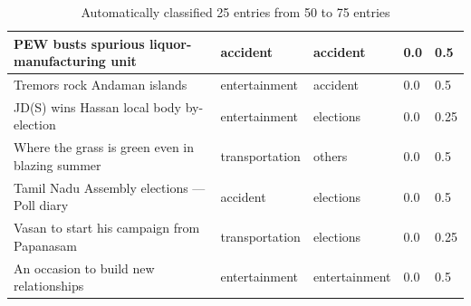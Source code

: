 \begin{table}
\begin{tabular}{ | p{5.4cm} | p{2.0cm} | p{2.0cm}|p{1.3cm}|p{1.5cm}|}
\hline
PEW busts spurious liquor-manufacturing unit & accident  & accident & 0.0 & 0.5 \\
\hline
Tremors rock Andaman islands & entertainment  & accident & 0.0 & 0.5 \\
\hline
JD(S) wins Hassan local body by-election & entertainment  & elections & 0.0 & 0.25 \\
\hline
Where the grass is green even in blazing summer & transportation  & others & 0.0 & 0.5 \\
\hline
Tamil Nadu Assembly elections — Poll diary & accident  & elections & 0.0 & 0.5 \\
\hline
Vasan to start his campaign from Papanasam & transportation  & elections & 0.0 & 0.25 \\
\hline
An occasion to build new relationships & entertainment  & entertainment & 0.0 & 0.5 \\
\hline

\end{tabular}
\caption{Automatically classified 25 entries from 50 to 75 entries}
\label{table:ql2-3}
\end{table}

